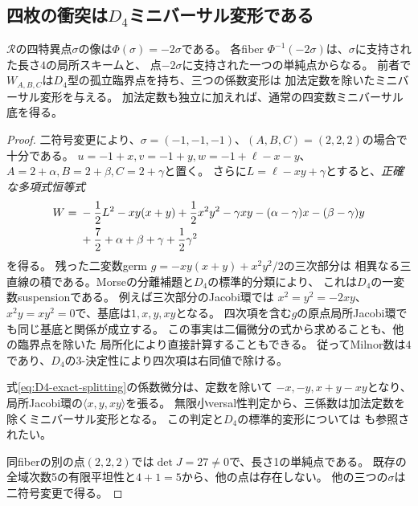 \subsection{四枚の衝突は\texorpdfstring{$D_4$}{D4}ミニバーサル変形である}
\begin{theorem}
\label{thm:character-D4-unfolding}
$\mathcal R$の四特異点$\sigma$の像は$\Phi(\sigma)=-2\sigma$である。
各fiber $\Phi^{-1}(-2\sigma)$は、$\sigma$に支持された長さ$4$の局所スキームと、
点$-2\sigma$に支持された一つの単純点からなる。
前者で$W_{A,B,C}$は$D_4$型の孤立臨界点を持ち、三つの係数変形は
加法定数を除いたミニバーサル変形を与える。
加法定数も独立に加えれば、通常の四変数ミニバーサル底を得る。
\end{theorem}
\begin{proof}
二符号変更により、$\sigma=(-1,-1,-1)$、$(A,B,C)=(2,2,2)$の場合で十分である。
$u=-1+x,v=-1+y,w=-1+\ell-x-y$、
$A=2+\alpha,B=2+\beta,C=2+\gamma$と置く。
さらに$L=\ell-xy+\gamma$とすると、\emph{正確な多項式恒等式}
\begin{align}\label{eq:D4-exact-splitting}
 W={}&-\frac12L^2-xy(x+y)+\frac12x^2y^2
       -\gamma xy-(\alpha-\gamma)x-(\beta-\gamma)y\notag\\
    &+\frac72+\alpha+\beta+\gamma+\frac12\gamma^2
\end{align}
を得る。
残った二変数germ $g=-xy(x+y)+x^2y^2/2$の三次部分は
相異なる三直線の積である。Morseの分離補題と$D_4$の標準的分類により、
これは$D_4$の一変数suspensionである。
例えば三次部分のJacobi環では
$x^2=y^2=-2xy$、$x^2y=xy^2=0$で、基底は$1,x,y,xy$となる。
四次項を含む$g$の原点局所Jacobi環でも同じ基底と関係が成立する。
この事実は二偏微分の式から求めることも、他の臨界点を除いた
局所化により直接計算することもできる。
従ってMilnor数は$4$であり、$D_4$の$3$-決定性により四次項は右同値で除ける。

式\eqref{eq:D4-exact-splitting}の係数微分は、定数を除いて
$-x,-y,x+y-xy$となり、局所Jacobi環の$\langle x,y,xy\rangle$を張る。
無限小versal性判定から、三係数は加法定数を除くミニバーサル変形となる。
この判定と$D_4$の標準的変形については
\cite[Proposition 3, \S5]{MikoszWeberTriality}も参照されたい。

同fiberの別の点$(2,2,2)$では$\det J=27\ne0$で、長さ1の単純点である。
既存の全域次数5の有限平坦性と$4+1=5$から、他の点は存在しない。
他の三つの$\sigma$は二符号変更で得る。
\end{proof}

